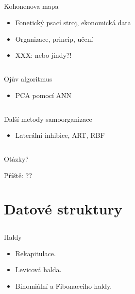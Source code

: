 \documentclass{beamer}
\begin{document}
\subsection{}
\begin{frame}{Kohonenova mapa}
\begin{itemize}
\item Fonetický psací stroj, ekonomická data
\item Organizace, princip, učení
\item XXX: nebo jindy?!
\end{itemize}
\end{frame}

\subsection{}
\begin{frame}{Ojův algoritmus}
\begin{itemize}
\item PCA pomocí ANN
\end{itemize}
\end{frame}

\subsection{}
\begin{frame}{Další metody samoorganizace}
\begin{itemize}
\item Laterální inhibice, ART, RBF
\end{itemize}
\end{frame}

\subsection{}
\begin{frame}{Otázky?}
\begin{center}
Příště: ??
\end{center}
\end{frame}

\section{Datové struktury}

\subsection{}
\begin{frame}{Haldy}
\begin{itemize}
\item Rekapitulace.
\item Levicová halda.
\item Binomiální a Fibonacciho haldy.
\end{itemize}
\end{frame}
\end{document}
